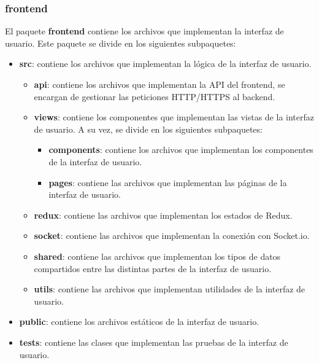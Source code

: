 \subsubsection{frontend}
El paquete \textbf{frontend} contiene los archivos que implementan la interfaz de usuario. Este paquete se divide en los siguientes subpaquetes:
\begin{itemize} 
    \item \textbf{src}: contiene los archivos que implementan la lógica de la interfaz de usuario.
    \begin{itemize}
        \item \textbf{api}: contiene los archivos que implementan la API del frontend, se encargan de gestionar las peticiones HTTP/HTTPS al backend.
        \item \textbf{views}: contiene los componentes que implementan las vistas de la interfaz de usuario. A su vez, se divide en los siguientes subpaquetes:
        \begin{itemize}
            \item \textbf{components}: contiene los archivos que implementan los componentes de la interfaz de usuario.
            \item \textbf{pages}: contiene las archivos que implementan las páginas de la interfaz de usuario.
        \end{itemize}
        \item \textbf{redux}: contiene las archivos que implementan los estados de Redux.
        \item \textbf{socket}: contiene las archivos que implementan la conexión con Socket.io.
        \item \textbf{shared}: contiene las archivos que implementan los tipos de datos compartidos entre las distintas partes de la interfaz de usuario.
        \item \textbf{utils}: contiene las archivos que implementan utilidades de la interfaz de usuario.
    \end{itemize}
    \item \textbf{public}: contiene los archivos estáticos de la interfaz de usuario.
    \item \textbf{tests}: contiene las clases que implementan las pruebas de la interfaz de usuario.
\end{itemize}

